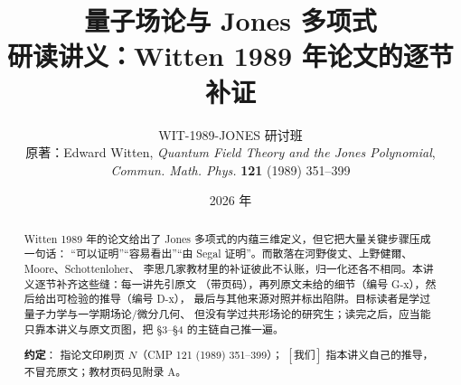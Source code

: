 

\title{\bfseries 量子场论与 Jones 多项式\\[4pt]
\large 研读讲义：Witten 1989 年论文的逐节补证}
\author{WIT-1989-JONES 研讨班\\[2pt]
\small 原著：Edward Witten, \emph{Quantum Field Theory and the Jones Polynomial},\\
\small \emph{Commun. Math. Phys.} \textbf{121} (1989) 351--399}
\date{2026 年}



\maketitle

\begin{abstract}
\noindent
Witten 1989 年的论文给出了 Jones 多项式的内蕴三维定义，但它把大量关键步骤压成一句话：
“可以证明”“容易看出”“由 Segal 证明”。而散落在河野俊丈、上野健爾、Moore、Schottenloher、
李思几家教材里的补证彼此不认账，归一化还各不相同。本讲义逐节补齐这些缝：每一讲先引原文
（带页码），再列原文未给的细节（编号 G-x），然后给出可检验的推导（编号 D-x），
最后与其他来源对照并标出陷阱。目标读者是学过量子力学与一学期场论/微分几何、
但没有学过共形场论的研究生；读完之后，应当能只靠本讲义与原文页图，把 \S3--\S4 的主链自己推一遍。

\medskip
\noindent\textbf{约定}： 指论文印刷页 $N$（CMP 121 (1989) 351--399）；
$[\text{我们}]$ 指本讲义自己的推导，不冒充原文；教材页码见附录 A。
\end{abstract}

\tableofcontents
\newpage
















\appendix







